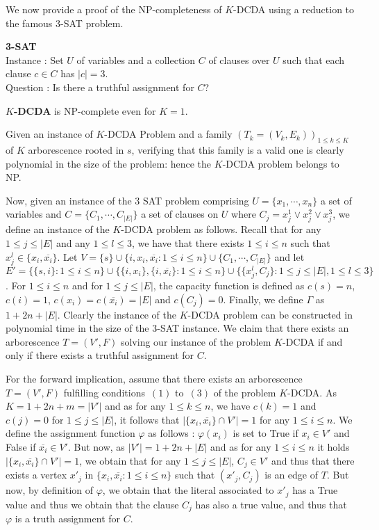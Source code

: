 We now provide a proof of the NP-completeness of $K$-DCDA using a
reduction to the famous 3-SAT problem.

{\noindent\bf 3-SAT\\} {\sc Instance :}
Set $U$ of variables and a collection $C$ of clauses over $U$ such that each clause $c\in C$ has $|c|=3$.\\
{\sc Question :} Is there a truthful assignment for $C$?

\begin{theorem}
  {\bf $K$-DCDA} is NP-complete even for $K=1$.
\end{theorem}

\bpr Given an instance of $K$-DCDA Problem and a family $\left
  (T_k=(V_k,E_k) \right )_{1\leq k\leq K}$ of $K$ arborescence rooted
in $s$, verifying that this family is a valid one is clearly
polynomial in the size of the problem: hence the $K$-DCDA problem
belongs to NP.



Now, given an instance of the 3 SAT problem comprising
$U=\{x_1,\cdots,x_n\}$ a set of variables and
$C=\{C_1,\cdots,C_{|E|}\}$ a set of clauses on $U$ where
$C_j=x_j^1\vee x_j^2\vee x_j^3 $, we define an instance of the
$K$-DCDA problem as follows.  Recall that for any $1\leq j \leq |E| $
and any $1\leq l\leq 3$, we have that there exists $1\leq i\leq n$
such that $x_j^l\in \{x_i, \overline{x_i}\}$. Let $V=\{s\}\cup \{i,
x_i, \overline{x_i} : 1\leq i \leq n\}\cup \{C_1,\cdots,C_{|E|}\}$ and
let $E'=\{\{s,i\} : 1\leq i \leq n\}\cup \{\{i,x_i\},
\{i,\overline{x_i}\} : 1\leq i \leq n\} \cup \{ \{x_j^l,C_j\}: 1\leq j
\leq |E|, 1\leq l\leq 3\}$.  For $1\leq i \leq n$ and for $1\leq j\leq
|E|$, the capacity function is defined as $c(s)=n$, $c(i)=1$,
$c(x_i)=c(\overline{x_i})=|E|$ and $c(C_j)=0$.  Finally, we define
$\Gamma$ as $1+2n+|E|$.  Clearly the instance of the $K$-DCDA problem
can be constructed in polynomial time in the size of the 3-SAT
instance.  We claim that there exists an arborescence $T=(V',F)$
solving our instance of the problem $K$-DCDA if and only if there
exists a truthful assignment for $C$.


For the forward implication, assume that there exists an arborescence
$T=(V',F)$ fulfilling conditions~$(1)$ to~$(3)$ of the problem
$K$-DCDA.  As $K=1+2n+m=|V'|$ and as for any $1\leq k \leq n$, we have
$c(k)=1$ and $c(j)=0$ for $1\leq j \leq |E|$, it follows that
$|\{x_i,\overline{x_i}\}\cap V'|=1$ for any $1\leq i \leq n$.  We
define the assignment function $\varphi$ as follows : $\varphi(x_i)$
is set to True if $x_i\in V'$ and False if $\overline{x_i}\in V'$.
But now, as $|V'|=1+2n+|E|$ and as for any $1\leq i \leq n$ it holds
$|\{x_i,\overline{x_i}\}\cap V'|=1$, we obtain that for any $1\leq
j\leq |E|$, $C_j \in V'$ and thus that there exists a vertex $x'_j$ in
$\{x_i,\overline{x_i} : 1\leq i \leq n\}$ such that $(x'_j,C_j)$ is an
edge of $T$.  But now, by definition of $\varphi$, we obtain that the
literal associated to $x'_j$ has a True value and thus we obtain that
the clause $C_j$ has also a true value, and thus that $\varphi$ is a
truth assignment for $C$.

